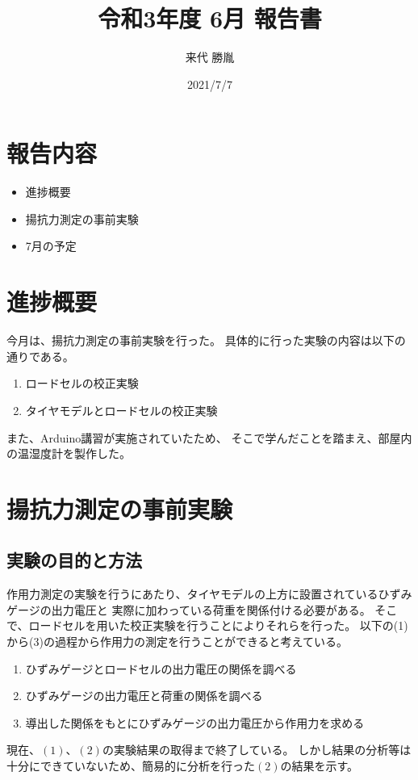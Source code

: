 \documentclass[twocolumn,a4j]{jsarticle}
\author{来代 勝胤}
\title{令和3年度 6月 報告書}
\date{2021/7/7}
\begin{document}
\maketitle
\section*{報告内容}
\begin{itemize}
    \item 進捗概要
    \item 揚抗力測定の事前実験
    \item 7月の予定
\end{itemize}
\section{進捗概要}
今月は、揚抗力測定の事前実験を行った。
具体的に行った実験の内容は以下の通りである。
\begin{enumerate}[(1)]
    \item ロードセルの校正実験
    \item タイヤモデルとロードセルの校正実験
\end{enumerate}
また、Arduino講習が実施されていたため、
そこで学んだことを踏まえ、部屋内の温湿度計を製作した。\\
\section{揚抗力測定の事前実験}
\subsection{実験の目的と方法}
作用力測定の実験を行うにあたり、タイヤモデルの上方に設置されているひずみゲージの出力電圧と
実際に加わっている荷重を関係付ける必要がある。
そこで、ロードセルを用いた校正実験を行うことによりそれらを行った。
以下の(1)から(3)の過程から作用力の測定を行うことができると考えている。
\begin{enumerate}[(1)]
    \item ひずみゲージとロードセルの出力電圧の関係を調べる
    \item ひずみゲージの出力電圧と荷重の関係を調べる
    \item 導出した関係をもとにひずみゲージの出力電圧から作用力を求める
\end{enumerate}
現在、$\left(1\right)$、$\left(2\right)$の実験結果の取得まで終了している。
しかし結果の分析等は十分にできていないため、簡易的に分析を行った$\left(2\right)$の結果を示す。\\
\end{document}

